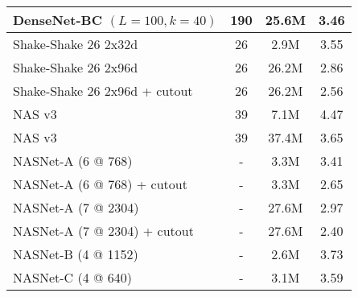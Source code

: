 \documentclass[10pt,twocolumn,letterpaper]{article}
\begin{document}
\begin{tabular}{l|cc|c}
DenseNet-BC $(L=100, k=40)$ \cite{Huang2016Densely} & 190 & 25.6M &  3.46  \\
\midrule
Shake-Shake 26 2x32d \cite{gastaldi17shakeshake} & 26 & 2.9M & 3.55 \\
Shake-Shake 26 2x96d \cite{gastaldi17shakeshake} & 26 & 26.2M & 2.86 \\
Shake-Shake 26 2x96d + cutout \cite{devries2017improved} & 26 & 26.2M & 2.56 \\
\midrule
NAS v3 \cite{zoph2017neural}& 39 & 7.1M & 4.47  \\
NAS v3 \cite{zoph2017neural}& 39 & 37.4M & 3.65 \\
\midrule
NASNet-A \;(6 @ 768) & - & 3.3M & 3.41 \\
NASNet-A \;(6 @ 768) + cutout & - & 3.3M & 2.65 \\
NASNet-A \;(7 @ 2304) & - & 27.6M & 2.97 \\
NASNet-A \;(7 @ 2304) + cutout & - & 27.6M & 2.40 \\
NASNet-B \;(4 @ 1152) & - & 2.6M & 3.73 \\
NASNet-C \;(4 @ 640) & - & 3.1M & 3.59 \\
\bottomrule
\end{tabular}
\end{document}
